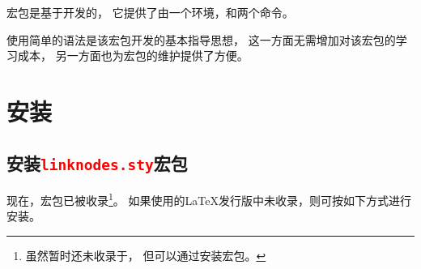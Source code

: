 \documentclass[DIV=14,
               fontsize=10,
               headinclude=false,
               index=totoc,
               footinclude=false,
               headings=small]{tkz-doc-zh}
\begin{document}
\bigskip
宏包是基于\TIKZ{}开发的，
它提供了由一个环境，和两个命令。

使用简单的语法是该宏包开发的基本指导思想，
这一方面无需增加对该宏包的学习成本，
另一方面也为宏包的维护提供了方便。

\vfill\newpage 
\section{安装}\label{ins}
\subsection{安装\texttt{\textcolor{red}{linknodes.sty}}宏包}

\newcommand{\drawpage}[4]{%
  \begin{scope}[xshift=#1, yshift=#2,font=\footnotesize]
    \filldraw[fill=white!75!#4,draw=#4, very thin]%
   (0,0) -- (4.2,0) -- (4.2,4.85) --(3.21,5.84)-- (0,5.84) -- cycle;
   \fill[fill=#4,shade,top color=#4,bottom color=#4!40]%
       (3.21,5.84) -- ++(0,-0.99) -- ++(0.99,0) -- cycle;
    \path (2.1,2.97) node{#3};
  \end{scope}
}   


现在，宏包已被收录\footnote{
虽然暂时还未收录于，
但可以通过安装宏包。}。
如果使用的\LaTeX{}发行版中未收录，则可按如下方式进行安装。
\end{document}

